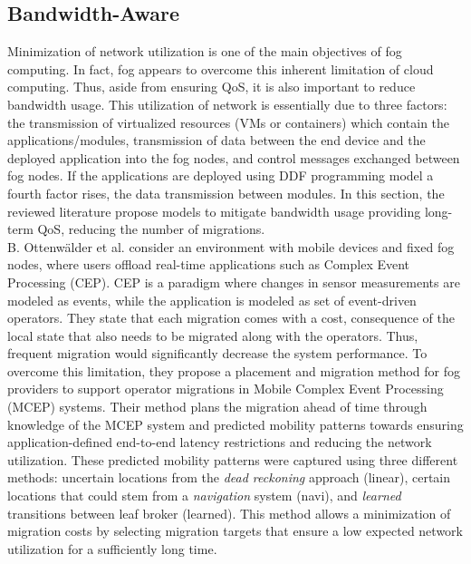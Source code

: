 \subsection{Bandwidth-Aware}\label{sec:bandwidth}
Minimization of network utilization is one of the main objectives of fog computing. In fact, fog appears to overcome this inherent limitation of cloud computing. Thus, aside from ensuring QoS, it is also important to reduce bandwidth usage.
This utilization of network is essentially due to three factors: the transmission of virtualized resources (VMs or containers) which contain the applications/modules, transmission of data between the end device and the deployed application into the fog nodes, and control messages exchanged between fog nodes. If the applications are deployed using DDF programming model a fourth factor rises, the data transmission between modules. In this section, the reviewed literature propose models to mitigate bandwidth usage providing long-term QoS, reducing the number of migrations.\\
%
\noindent\tab B. Ottenwälder et al. \cite{ottenwalder2013migcep} consider an environment with mobile devices and fixed fog nodes, where users offload real-time applications such as Complex Event Processing (CEP). CEP is a paradigm where changes in sensor measurements are modeled as events, while the application is modeled as set of event-driven operators. They state that each migration comes with a cost, consequence of the local state that also needs to be migrated along with the operators. Thus, frequent migration would significantly decrease the system performance. To overcome this limitation, they propose a placement and migration method for fog providers to support operator migrations in Mobile Complex Event Processing (MCEP) systems. Their method plans the migration ahead of time through knowledge of the MCEP system and predicted mobility patterns towards ensuring application-defined end-to-end latency restrictions and reducing the network utilization. These predicted mobility patterns were captured using three different methods: uncertain locations from the \textit{dead reckoning} approach (linear), certain locations that could stem from a \textit{navigation} system (navi), and \textit{learned} transitions between leaf broker (learned). This method allows a minimization of migration costs by selecting migration targets that ensure a low expected network utilization for a sufficiently long time.\\ %
